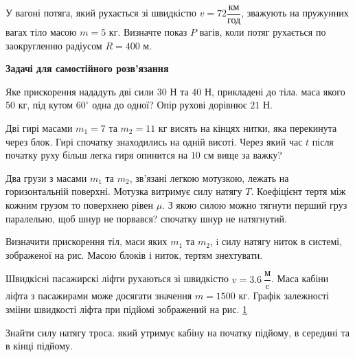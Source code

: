 	\begin{problem}{7}
		У вагоні потяга, який рухається зі швидкістю $v = 72 \dfrac{\text{км}}{\text{год}}$, зважують на пружунних вагах тіло масою $m = 5$ кг. Визначте показ $P$ вагів, коли потяг рухається по заокругленню радіусом $R = 400$ м.
	\end{problem}


\textbf{Задачі для самостійного розв'язання}



\begin{problem}{6}
	Яке прискорення нададуть дві сили $30$ Н та $40$ Н, прикладені до тіла. маса якого $50$ кг, під кутом $60^{\circ}$ одна до одної? Опір рухові дорівнює $21$ Н.
\end{problem}

\begin{problem}{4}
	Дві гирі масами $m_1 = 7$ та $m_2 = 11$ кг висять на кінцях нитки, яка перекинута через блок. Гирі спочатку знаходились на одній висоті. Через який час $t$ після початку руху більш легка гиря опинится на $10$ см вище за важку?
\end{problem}

\begin{problem}{7}
	Два грузи з масами $m_1$ та $m_2$, зв'язані легкою мотузкою, лежать на горизонтальній поверхні. Мотузка витримує силу натягу $T$. Коефіцієнт тертя між кожним грузом то поверхнею рівен $\mu$. З якою силою можно тягнути перший груз паралельно, щоб шнур не порвався? спочатку шнур не натягнутий. 
\end{problem}

\begin{problem}{8}
	Визначити прискорення тіл, маси яких $m_1$ та $m_2$, i силу натягу ниток в системі, зображеної на рис. Масою блоків і ниток, тертям знехтувати.
\end{problem}

\begin{problem}{9}
	Швидкісні пасажирскі ліфти рухаються зі швидкістю $v = 3.6 ~\dfrac{\text{м}}{\text{c}}$. Маса кабіни ліфта з пасажирами може досягати значення $m = 1500$ кг. Графік залежності змііни швидкості ліфта при підйомі зображений на рис. \ref{lift}
	
	Знайти силу натягу троса. який утримує кабіну на початку підйому, в середині та в кінці підйому.
	
	\begin{figure}[h!]
		\centering
		\caption{}
		\label{lift}
	\end{figure}

\end{problem}

